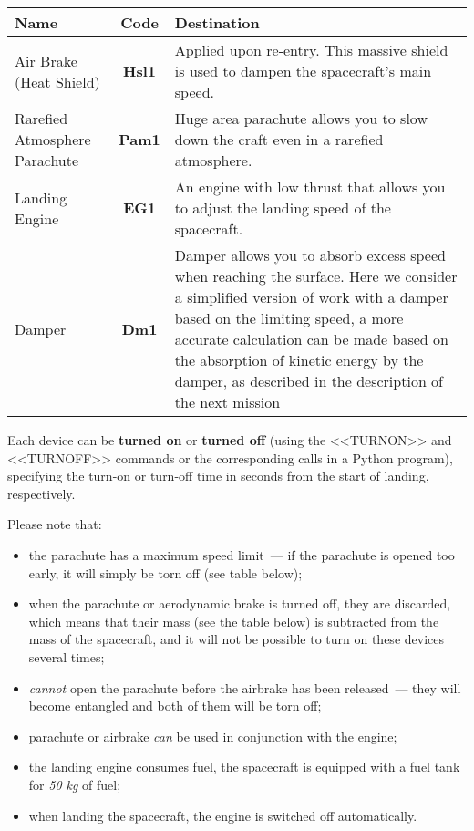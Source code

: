 \documentclass[12pt,a4paper]{article}
\begin{document}
\begin{center}
\begin{tabular}{ |p{5cm}|c|p{8.5cm}| }
   \hline
   \textbf{Name} & \textbf{Code} & \textbf{Destination} \\
   \hline
   Air Brake (Heat Shield) & \textbf{Hsl1} & Applied upon re-entry. This massive shield is used to dampen the spacecraft's main speed. \\
   \hline
   Rarefied Atmosphere Parachute & \textbf{Pam1} & Huge area parachute allows you to slow down the craft even in a rarefied atmosphere.\\
   \hline
   Landing Engine & \textbf{EG1} & An engine with low thrust that allows you to adjust the landing speed of the spacecraft. \\
   \hline
   Damper & \textbf{Dm1} & Damper allows you to absorb excess speed when reaching the surface. Here we consider a simplified version of work with a damper based on the limiting speed, a more accurate calculation can be made based on the absorption of kinetic energy by the damper, as described in the description of the next mission\\
   \hline
\end{tabular}
\end{center}

Each device can be \textbf{turned on} or \textbf{turned off} (using the <<TURNON>> and <<TURNOFF>> commands or the corresponding calls in a Python program), specifying the turn-on or turn-off time in seconds from the start of landing, respectively.

Please note that:

\begin{itemize}
   \item the parachute has a maximum speed limit~--- if the parachute is opened too early, it will simply be torn off (see table below);
   \item when the parachute or aerodynamic brake is turned off, they are discarded, which means that their mass (see the table below) is subtracted from the mass of the spacecraft, and it will not be possible to turn on these devices several times;
   \item \emph{cannot} open the parachute before the airbrake has been released~--- they will become entangled and both of them will be torn off;
   \item parachute or airbrake \emph{can} be used in conjunction with the engine;
   \item the landing engine consumes fuel, the spacecraft is equipped with a fuel tank for \emph{50 kg} of fuel;
   \item when landing the spacecraft, the engine is switched off automatically.
\end{itemize}
\end{document}
